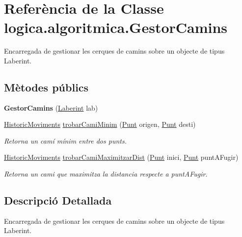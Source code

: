 \hypertarget{classlogica_1_1algoritmica_1_1_gestor_camins}{\section{Referència de la Classe logica.\+algoritmica.\+Gestor\+Camins}
\label{classlogica_1_1algoritmica_1_1_gestor_camins}
}


Encarregada de gestionar les cerques de camins sobre un objecte de tipus Laberint.  


\subsection*{Mètodes públics}
\begin{DoxyCompactItemize}
\item 
\hypertarget{classlogica_1_1algoritmica_1_1_gestor_camins_a042c8215a6d89097b5b8048a70872e35}{{\bfseries Gestor\+Camins} (\hyperlink{classlogica_1_1laberints_1_1_laberint}{Laberint} lab)}\label{classlogica_1_1algoritmica_1_1_gestor_camins_a042c8215a6d89097b5b8048a70872e35}

\item 
\hyperlink{classlogica_1_1historic__moviments_1_1_historic_moviments}{Historic\+Moviments} \hyperlink{classlogica_1_1algoritmica_1_1_gestor_camins_a5d7198aa32d0be2a72e15eda16f2ba3d}{trobar\+Cami\+Minim} (\hyperlink{classlogica_1_1_punt}{Punt} origen, \hyperlink{classlogica_1_1_punt}{Punt} desti)
\begin{DoxyCompactList}\small\item\em Retorna un camí mínim entre dos punts. \end{DoxyCompactList}\item 
\hyperlink{classlogica_1_1historic__moviments_1_1_historic_moviments}{Historic\+Moviments} \hyperlink{classlogica_1_1algoritmica_1_1_gestor_camins_abe60dac7f02241b56588f5518a4442ea}{trobar\+Cami\+Maximitzar\+Dist} (\hyperlink{classlogica_1_1_punt}{Punt} inici, \hyperlink{classlogica_1_1_punt}{Punt} punt\+A\+Fugir)
\begin{DoxyCompactList}\small\item\em Retorna un cami que maximitza la distancia respecte a punt\+A\+Fugir. \end{DoxyCompactList}\end{DoxyCompactItemize}


\subsection{Descripció Detallada}
Encarregada de gestionar les cerques de camins sobre un objecte de tipus Laberint. 

